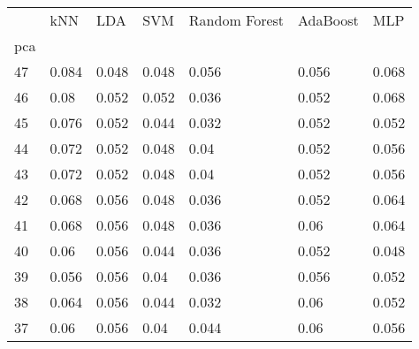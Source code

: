 \begin{tabular}{lllllll}
\toprule
{} &    kNN &    LDA &    SVM & Random Forest & AdaBoost &    MLP \\
pca &        &        &        &               &          &        \\
\midrule
47  &  0.084 &  0.048 &  0.048 &         0.056 &    0.056 &  0.068 \\
46  &   0.08 &  0.052 &  0.052 &         0.036 &    0.052 &  0.068 \\
45  &  0.076 &  0.052 &  0.044 &         0.032 &    0.052 &  0.052 \\
44  &  0.072 &  0.052 &  0.048 &          0.04 &    0.052 &  0.056 \\
43  &  0.072 &  0.052 &  0.048 &          0.04 &    0.052 &  0.056 \\
42  &  0.068 &  0.056 &  0.048 &         0.036 &    0.052 &  0.064 \\
41  &  0.068 &  0.056 &  0.048 &         0.036 &     0.06 &  0.064 \\
40  &   0.06 &  0.056 &  0.044 &         0.036 &    0.052 &  0.048 \\
39  &  0.056 &  0.056 &   0.04 &         0.036 &    0.056 &  0.052 \\
38  &  0.064 &  0.056 &  0.044 &         0.032 &     0.06 &  0.052 \\
37  &   0.06 &  0.056 &   0.04 &         0.044 &     0.06 &  0.056 \\
\bottomrule
\end{tabular}
